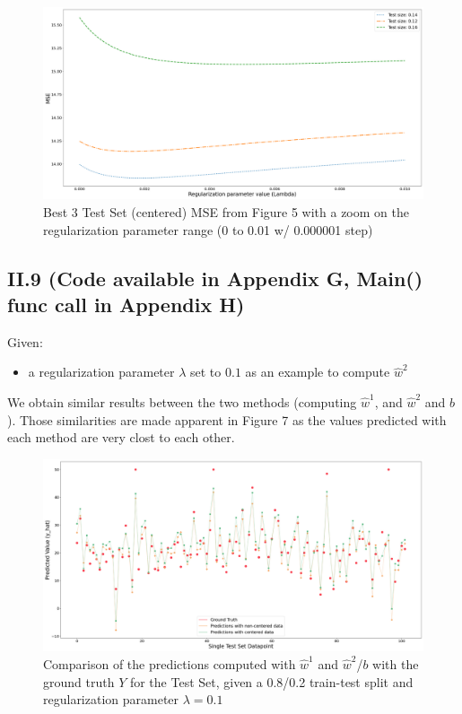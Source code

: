 \documentclass{homework}
\begin{document}
\begin{figure}[H]
\begin{center}
\includegraphics[width=\textwidth]{images/grid_search_w2_best3_focus.png}
\end{center}
\caption{Best 3 Test Set (centered) MSE from Figure 5 with a zoom on the regularization parameter range (0 to 0.01 w/ 0.000001 step)}
\end{figure}

\subsection*{II.9 (Code available in Appendix G, Main() func call in Appendix H)} 

Given:
\begin{itemize}
    \item a regularization parameter $\lambda$ set to $0.1$ as an example to compute $\hat{w}^2$
\end{itemize}
We obtain similar results between the two methods (computing $\hat{w}^1$, and $\hat{w}^2$ and $b$). Those similarities are made apparent 
in Figure 7 as the values predicted with each method are very clost to each other.

\begin{figure}[H]
\begin{center}
\includegraphics[width=\textwidth]{images/w1_w2_compare.png}
\end{center}
\caption{Comparison of the predictions computed with $\hat{w}^1$ and $\hat{w}^2$/$b$ with the ground truth $Y$ for the 
Test Set, given a 0.8/0.2 train-test split and regularization parameter $\lambda=0.1$}
\end{figure}
\end{document}
